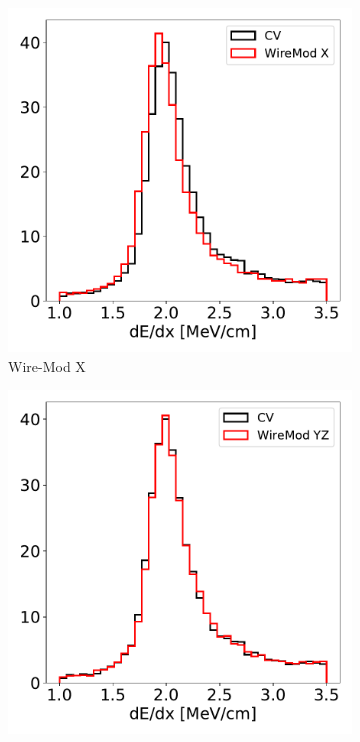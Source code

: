 \documentclass[a4paper]{article}
\begin{document}
\begin{figure}[H] 
\begin{center}
    \begin{subfigure}[b]{0.19\textwidth}
    \centering
    \includegraphics[width=1.00\textwidth]{detsys/dedx/shr_tkfit_dedx_max_03232020_WireMod_X.pdf}
    \caption{\label{fig:detsys:dedx:WMX}Wire-Mod X}
    \end{subfigure}
    \begin{subfigure}[b]{0.19\textwidth}
    \centering
    \includegraphics[width=1.00\textwidth]{detsys/dedx/shr_tkfit_dedx_max_03232020_WireMod_YZ.pdf}

\end{subfigure}
\end{center}
\end{figure}
\end{document}
